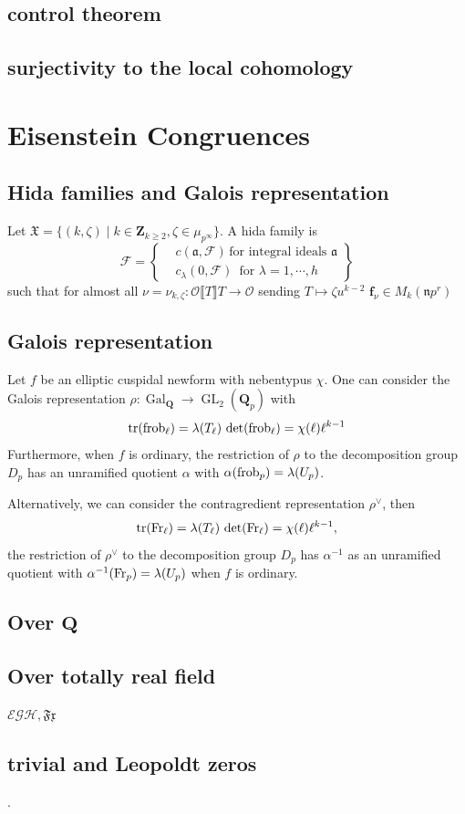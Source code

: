 \documentclass[leqno]{amsart}
\theoremstyle{definition}
\theoremstyle{remark}
\newcommand{\oo}{\mathcal{O}}
\newcommand{\Q}{{\mathbf{Q}}}
\newcommand{\Z}{{\mathbf{Z}}}
\newcommand{\Qp}{\mathbf{Q}_p}
\DeclareMathOperator{\GL}{GL}
\DeclareMathOperator{\mtr}{tr}
\DeclareMathOperator{\Gal}{Gal}
\newcommand{\Fr}{\textnormal{Fr}} %
\newcommand{\frob}{\textnormal{frob}} %
\newcommand{\fa}{\mathfrak{a}}
\newcommand{\fn}{\mathfrak{n}}
\newcommand{\fX}{\mathfrak{X}}
\begin{document}
\subsection{control theorem}

\subsection{surjectivity to the local cohomology}

\section{Eisenstein Congruences}

\subsection{Hida families and Galois representation}

Let 
$\fX=\{(k,\zeta)\mid k\in\Z_{k\geq 2},\zeta\in\mu_{p^\infty}\}$.
A hida family is 
\[
	\mathscr{F}=
	\left\{
		\begin{aligned}
			&c( \fa,\mathscr{F})\, 
			\text{for integral ideals }\fa\\
			&c_{\lambda}(0,\mathscr{F})\,
			\text{ for }\lambda=1,\cdots,h
		\end{aligned}
	\right\}
\]
such that for almost all 
$\nu=\nu_{k,\zeta}\colon \oo\llbracket T\rrbracket T\to \oo$ 
sending $T\mapsto \zeta u^{k-2}$
$\mathbf{f}_\nu\in M_k(\fn p^r)$

\subsection{Galois representation}

Let $f$ be an elliptic cuspidal newform
with nebentypus  $\chi$.
One can consider the Galois representation
$\rho\colon \Gal_\Q\to\GL_2(\Qp)$ with 
\[
	\mtr(\frob_\ell)=\lambda(T_\ell)\,
	\det(\frob_\ell)=\chi(\ell)\ell^{k-1}
\]
Furthermore, when $f$ is ordinary,
the restriction of  $\rho$ to the decomposition group 
$D_p$ has an unramified quotient  $\alpha$
with $\alpha(\frob_p)=\lambda(U_p)$.

Alternatively, we can consider the contragredient representation
$\rho^\vee$, then 
\[
	\mtr(\Fr_\ell)=\lambda(T_\ell)\,
	\det(\Fr_\ell)=\chi(\ell)\ell^{k-1},
\]
the restriction of  $\rho^\vee$ to the decomposition group 
$D_p$ has $\alpha^{-1}$ as an unramified quotient
with $\alpha^{-1}(\Fr_p)=\lambda(U_p)$
when $f$ is ordinary.


\subsection{Over $\Q$}

\subsection{Over totally real field}

$\mathcal{EGH}, \mathfrak{Fx}$

\subsection{trivial and Leopoldt zeros}.



\end{document}
